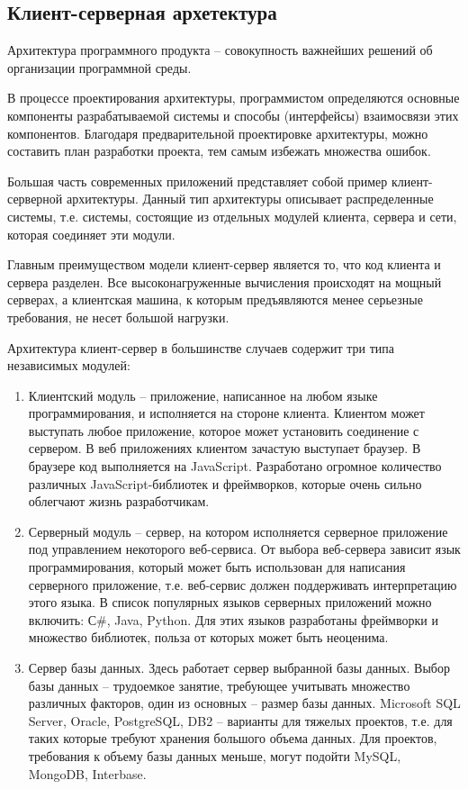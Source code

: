\subsection{Клиент-серверная архетектура}

Архитектура программного продукта – совокупность важнейших решений об организации программной среды. 

В процессе проектирования архитектуры, программистом определяются основные компоненты разрабатываемой системы и способы (интерфейсы) взаимосвязи этих компонентов. Благодаря предварительной проектировке архитектуры, можно составить план разработки проекта, тем самым избежать множества ошибок.

Большая часть современных приложений представляет собой пример клиент-серверной архитектуры. Данный тип архитектуры описывает распределенные системы, т.е. системы, состоящие из отдельных модулей клиента, сервера и сети, которая соединяет эти модули. 

Главным преимуществом модели клиент-сервер является то, что код клиента и сервера разделен. Все высоконагруженные вычисления происходят на мощный серверах, а клиентская машина, к которым предъявляются менее серьезные требования, не несет большой нагрузки.

Архитектура клиент-сервер в большинстве случаев содержит три типа независимых модулей:
\begin{enumerate}
	\item Клиентский модуль – приложение, написанное на любом языке программирования, и исполняется на стороне клиента. Клиентом может выступать любое приложение, которое может установить соединение с сервером. В веб приложениях клиентом зачастую выступает браузер. В браузере код выполняется на JavaScript. Разработано огромное количество различных JavaScript-библиотек и фреймворков, которые очень сильно облегчают жизнь разработчикам.
	\item Серверный модуль – сервер, на котором исполняется серверное приложение под управлением некоторого веб-сервиса. От выбора веб-сервера зависит язык программирования, который может быть использован для написания серверного приложение, т.е. веб-сервис должен поддерживать интерпретацию этого языка. В список популярных языков серверных приложений можно включить: С\#, Java, Python. Для этих языков разработаны фреймворки и множество библиотек, польза от которых может быть неоценима.
	\item Сервер базы данных. Здесь работает сервер выбранной базы данных. Выбор базы данных – трудоемкое занятие, требующее учитывать множество различных факторов, один из основных – размер базы данных. Microsoft SQL Server, Oracle, PostgreSQL, DB2 – варианты для тяжелых проектов, т.е. для таких которые требуют хранения большого объема данных. Для проектов, требования к объему базы данных меньше, могут подойти MySQL, MongoDB, Interbase.
\end{enumerate}

